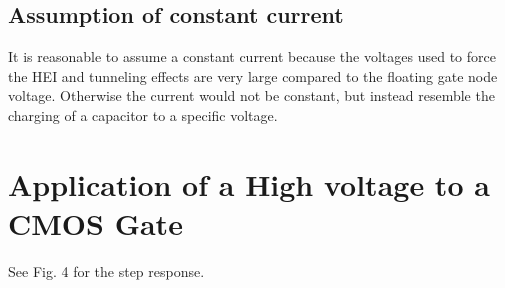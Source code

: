 \subsection{Assumption of constant current}
It is reasonable to assume a constant current because the voltages used to force the HEI and tunneling effects are very large compared to the
floating gate node voltage. Otherwise the current would not be constant, but instead resemble the charging of a capacitor to a specific voltage.

\section{Application of a High voltage to a CMOS Gate}
See Fig. 4 for the step response.


